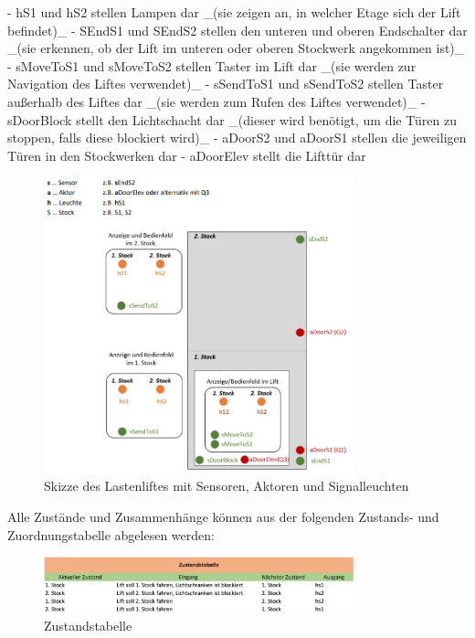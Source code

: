 \begin{markdown}
- hS1 und hS2 stellen Lampen dar _(sie zeigen an, in welcher Etage sich der Lift befindet)_
- SEndS1 und SEndS2 stellen den unteren und oberen Endschalter dar _(sie erkennen, ob der Lift im unteren oder oberen Stockwerk angekommen ist)_
- sMoveToS1 und sMoveToS2 stellen Taster im Lift dar _(sie werden zur Navigation des Liftes verwendet)_
- sSendToS1 und sSendToS2 stellen Taster außerhalb des Liftes dar _(sie werden zum Rufen des Liftes verwendet)_
- sDoorBlock stellt den Lichtschacht dar _(dieser wird benötigt, um die Türen zu stoppen, falls diese blockiert wird)_ 
- aDoorS2 und aDoorS1 stellen die jeweiligen Türen in den Stockwerken dar
- aDoorElev stellt die Lifttür dar

\begin{figure}[h!]
    \centering
    \includegraphics[width=0.8\textwidth]{./images/Skizze.png}
    \caption[Skizze des Lastenliftes]{Skizze des Lastenliftes mit Sensoren, Aktoren und Signalleuchten}
\end{figure}

Alle Zustände und Zusammenhänge können aus der folgenden Zustands- und Zuordnungstabelle abgelesen werden:

\begin{figure}[h!]
    \centering
    \includegraphics[width=0.8\textwidth]{./images/Zustandstabelle.png}
    \caption[Zustandstabelle]{Zustandstabelle}
\end{figure}


\end{markdown}
